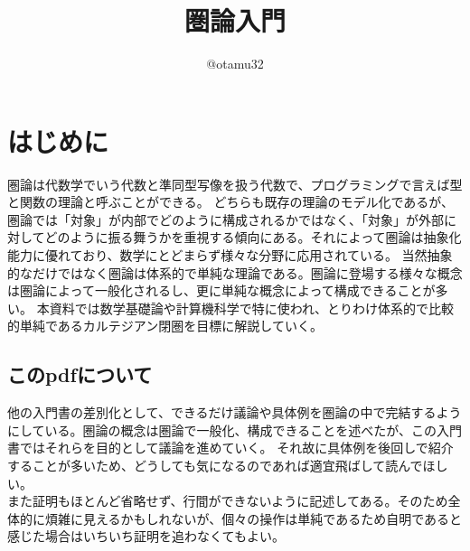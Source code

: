 \documentclass[uplatex,dvipdfmx]{jsarticle}
\numberwithin{proof}{subsection}
\begin{document}
	\title{圏論入門}
  \author{@otamu32}
	\maketitle
	\tableofcontents
	\section{はじめに}
  圏論は代数学でいう代数と準同型写像を扱う代数で、プログラミングで言えば型と関数の理論と呼ぶことができる。
  どちらも既存の理論のモデル化であるが、圏論では「対象」が内部でどのように構成されるかではなく、「対象」が外部に対してどのように振る舞うかを重視する傾向にある。それによって圏論は抽象化能力に優れており、数学にとどまらず様々な分野に応用されている。
  当然抽象的なだけではなく圏論は体系的で単純な理論である。圏論に登場する様々な概念は圏論によって一般化されるし、更に単純な概念によって構成できることが多い。
	本資料では数学基礎論や計算機科学で特に使われ、とりわけ体系的で比較的単純であるカルテジアン閉圏を目標に解説していく。

  \subsection{このpdfについて}
	他の入門書の差別化として、できるだけ議論や具体例を圏論の中で完結するようにしている。圏論の概念は圏論で一般化、構成できることを述べたが、この入門書ではそれらを目的として議論を進めていく。
  それ故に具体例を後回しで紹介することが多いため、どうしても気になるのであれば適宜飛ばして読んでほしい。\\
  また証明もほとんど省略せず、行間ができないように記述してある。そのため全体的に煩雑に見えるかもしれないが、個々の操作は単純であるため自明であると感じた場合はいちいち証明を追わなくてもよい。\\
\end{document}
